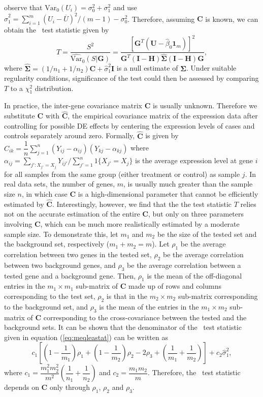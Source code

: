 	observe
	that $\mbox{Var}_{0}(U_i)=\sigma_0^2+\sigma_1^2$ and use
	$\hat\sigma_1^2=\sum_{i=1}^m(U_i-\overline{U})^2/(m-1)-\sigma_0^2$. Therefore, assuming $\bm C$ 
	is
	known, we can obtain the \OurMethod~test statistic given by
	\begin{equation}\label{eq:meqleastat}
	T = \dfrac{S^2}{\widehat{\mbox{Var}}_{0}(S|\bm G)} = \dfrac{[\bm G^T(\bm U-\hat\beta_0\bm
		1_m)]^2}{\bm G^T(\bm I-\bm H)\hat{\bm\Sigma}(\bm I-\bm H)\bm G}, 
	\end{equation}
	where $\hat{\bm\Sigma}=(1/n_1+1/n_2)\bm C+\hat\sigma_1^2\bm I$ is a null estimate of $\bm 
	\Sigma$. Under suitable regularity conditions, significance of the test could then be assessed 
	by comparing $T$ to a $\chi^2_1$ distribution.
	
	
	In practice, the inter-gene covariance matrix $\bm C$ is usually unknown. Therefore we 
	substitute $\bm C$ with $\hat {\bm C}$, the empirical covariance matrix of the expression data 
	after controlling for
	possible DE effects by centering the expression levels of cases and controls separately around
	zero. Formally, $\hat {\bm C}$ is given by $\hat
	C_{ik}=\dfrac{1}{n}\sum_{j=1}^n(Y_{ij}-\alpha_{ij})(Y_{kj}-\alpha_{kj})$ where
	$\alpha_{ij}=\sum_{j':X_{j'}=X_{j}}Y_{ij'}/\sum_{j'=1}^n1\{X_{j'}=X_{j}\}$ is the average 
	expression level at gene $i$ for all samples from the same group (either treatment or control) 
	as sample $j$. In real data sets, the number of genes, $m$, is usually much greater than the 
	sample size $n$, in
	which case $\bm C$ is a high-dimensional parameter that cannot be efficiently estimated by $\hat
	{\bm C}$. Interestingly, however, we find that the the test statistic $T$ relies not on
	the accurate estimation of the entire $\bm C$, but only on three parameters involving $\bm C$, 
	which can be much more realistically estimated by a moderate sample size. To demonstrate this, 
	let $m_1$ and $m_2$ be the size of the tested set and the background set, respectively 
	($m_1+m_2=m$). Let $\rho_1$ be the average correlation between two genes in the tested set, 
	$\rho_2$ be the average correlation between two background genes, and $\rho_3$ be the average 
	correlation between a tested gene and a background gene. Then, $\rho_1$ is the mean of the 
	off-diagonal entries in the $m_1\times m_1$ sub-matrix of $\bm C$ made up of rows and columns 
	corresponding to the test set, $\rho_2$ is that in the $m_2\times m_2$ sub-matrix corresponding 
	to the background set, and $\rho_3$ is the mean of the entries in the $m_1\times m_2$ 
	sub-matrix of $\bm C$ corresponding to the cross-covariance between the tested and the 
	background sets. It can be shown that the denominator of the \OurMethod~test statistic given in 
	equation (\ref{eq:meqleastat}) can be written as
	\begin{equation}\label{eq:stat_denom1}
	c_1[(1-\dfrac{1}{m_1})\rho_1 + (1-\dfrac{1}{m_2})\rho_2 - 2\rho_3 + 
	(\dfrac{1}{m_1}+\dfrac{1}{m_2})]+c_2\hat\sigma_1^2,
	\end{equation}
	where $c_1=\dfrac{m_1^2m_2^2}{m^2}(\dfrac{1}{n_1}+\dfrac{1}{n_2})$ and $c_2=\dfrac{m_1m_2}{m}$. 
	Therefore, the \OurMethod~test statistic depends on $\bm C$ only through $\rho_1$, $\rho_2$ and 
	$\rho_3$. 
	
